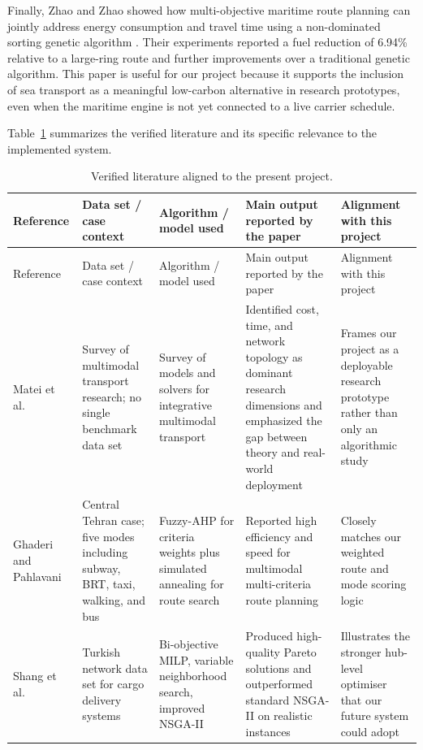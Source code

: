 Finally, Zhao and Zhao showed how multi-objective maritime route planning can jointly address energy consumption and travel time using a non-dominated sorting genetic algorithm \cite{zhao2024}. Their experiments reported a fuel reduction of 6.94\% relative to a large-ring route and further improvements over a traditional genetic algorithm. This paper is useful for our project because it supports the inclusion of sea transport as a meaningful low-carbon alternative in research prototypes, even when the maritime engine is not yet connected to a live carrier schedule.

Table~\ref{tab:literature-survey} summarizes the verified literature and its specific relevance to the implemented system.

\begin{longtable}{p{2.6cm}p{3.5cm}p{3.6cm}p{3.3cm}p{2.8cm}}
\caption{Verified literature aligned to the present project.}
\label{tab:literature-survey}\\
\toprule
Reference & Data set / case context & Algorithm / model used & Main output reported by the paper & Alignment with this project \\
\midrule
\endfirsthead
\toprule
Reference & Data set / case context & Algorithm / model used & Main output reported by the paper & Alignment with this project \\
\midrule
\endhead
Matei et al.~\cite{matei2021} & Survey of multimodal transport research; no single benchmark data set & Survey of models and solvers for integrative multimodal transport & Identified cost, time, and network topology as dominant research dimensions and emphasized the gap between theory and real-world deployment & Frames our project as a deployable research prototype rather than only an algorithmic study \\
Ghaderi and Pahlavani~\cite{ghaderi2015} & Central Tehran case; five modes including subway, BRT, taxi, walking, and bus & Fuzzy-AHP for criteria weights plus simulated annealing for route search & Reported high efficiency and speed for multimodal multi-criteria route planning & Closely matches our weighted route and mode scoring logic \\
Shang et al.~\cite{shang2021} & Turkish network data set for cargo delivery systems & Bi-objective MILP, variable neighborhood search, improved NSGA-II & Produced high-quality Pareto solutions and outperformed standard NSGA-II on realistic instances & Illustrates the stronger hub-level optimiser that our future system could adopt \\

\end{longtable}
